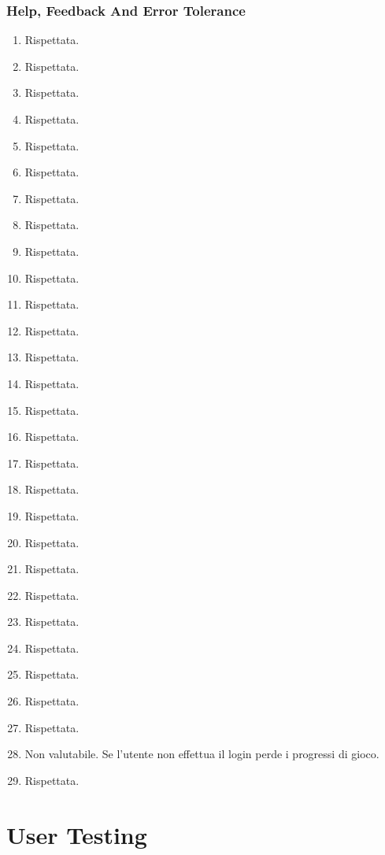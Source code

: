 \documentclass[../Report.tex]{subfiles}
\begin{document}
    \subsubsection{Help, Feedback And Error Tolerance}
    \begin{enumerate}
        \item Rispettata.
        \item Rispettata.
        \item Rispettata.
        \item Rispettata.
        \item Rispettata.
        \item Rispettata.
        \item Rispettata.
        \item Rispettata. 
        \item Rispettata.
        \item Rispettata.
        \item Rispettata.
        \item Rispettata.
        \item Rispettata.
        \item Rispettata.
        \item Rispettata.
        \item Rispettata.
        \item Rispettata.
        \item Rispettata.
        \item Rispettata.
        \item Rispettata.
        \item Rispettata.
        \item Rispettata.
        \item Rispettata.
        \item Rispettata. 
        \item Rispettata.
        \item Rispettata.
        \item Rispettata.
        \item Non valutabile. Se l'utente non effettua il login perde i progressi di gioco.
        \item Rispettata.
        
    \end{enumerate}

    
    \section{User Testing}
\end{document}
